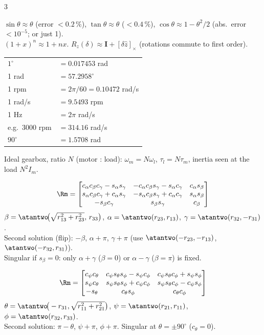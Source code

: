\begin{multicols}{3}
\begin{fbx}
$\sin\theta\approx\theta$ (error $<0.2\,\%$), $\tan\theta\approx\theta$ ($<0.4\,\%$), $\cos\theta\approx1-\theta^2/2$ (abs.\ error $<10^{-5}$; or just 1).\\
$(1+x)^n\approx1+nx$. $R_z(\delta)\approx\mathbf I+[\delta\hat z]_\times$ (rotations commute to first order).
\end{fbx}
\begin{tabularx}{\linewidth}{@{}Xl@{}}\toprule
$1^\circ$ & $=0.017453$ rad\\
1 rad & $=57.2958^\circ$\\
1 rpm & $=2\pi/60=0.10472$ rad/s\\
1 rad/s & $=9.5493$ rpm\\
1 Hz & $=2\pi$ rad/s\\
e.g.\ 3000 rpm & $=314.16$ rad/s\\
$90^\circ$ & $=1.5708$ rad\\\bottomrule
\end{tabularx}
Ideal gearbox, ratio $N$ (motor : load): $\omega_m=N\omega_l$, $\tau_l=N\tau_m$, inertia seen at the load $N^2I_m$. \added

\columnbreak
{}
\begin{fbxu}[ZYZ: $\Rm=R_z(\alpha)R_y(\beta)R_z(\gamma)$]
\[\Rm=\begin{bmatrix}c_\alpha c_\beta c_\gamma-s_\alpha s_\gamma&-c_\alpha c_\beta s_\gamma-s_\alpha c_\gamma&c_\alpha s_\beta\\ s_\alpha c_\beta c_\gamma+c_\alpha s_\gamma&-s_\alpha c_\beta s_\gamma+c_\alpha c_\gamma&s_\alpha s_\beta\\-s_\beta c_\gamma&s_\beta s_\gamma&c_\beta\end{bmatrix}\]
$\beta=\atantwo\!\big(\sqrt{r_{13}^2+r_{23}^2},\,r_{33}\big)$, $\alpha=\atantwo(r_{23},r_{13})$, $\gamma=\atantwo(r_{32},-r_{31})$.\\
Second solution (flip): $-\beta$, $\alpha+\pi$, $\gamma+\pi$ (use $\atantwo(-r_{23},-r_{13})$, $\atantwo(-r_{32},r_{31})$).\\
Singular if $s_\beta=0$: only $\alpha+\gamma$ ($\beta{=}0$) or $\alpha-\gamma$ ($\beta{=}\pi$) is fixed.
\end{fbxu}
\begin{fbxu}[ZYX (yaw $\psi$, pitch $\theta$, roll $\phi$): $\Rm=R_z(\psi)R_y(\theta)R_x(\phi)$]
\[\Rm=\begin{bmatrix}c_\psi c_\theta&c_\psi s_\theta s_\phi-s_\psi c_\phi&c_\psi s_\theta c_\phi+s_\psi s_\phi\\ s_\psi c_\theta&s_\psi s_\theta s_\phi+c_\psi c_\phi&s_\psi s_\theta c_\phi-c_\psi s_\phi\\-s_\theta&c_\theta s_\phi&c_\theta c_\phi\end{bmatrix}\]
$\theta=\atantwo\!\big(-r_{31},\sqrt{r_{11}^2+r_{21}^2}\big)$, $\psi=\atantwo(r_{21},r_{11})$, $\phi=\atantwo(r_{32},r_{33})$.\\
Second solution: $\pi-\theta$, $\psi+\pi$, $\phi+\pi$. Singular at $\theta=\pm90^\circ$ ($c_\theta=0$).
\end{fbxu}


\end{multicols}
